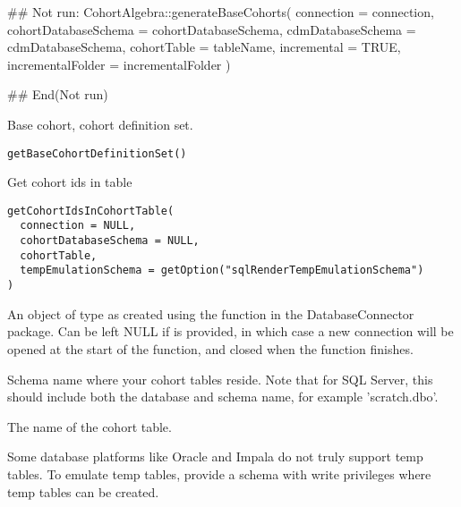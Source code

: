 \documentclass[a4paper]{book}
\begin{document}
%
\begin{Examples}
\begin{ExampleCode}
## Not run: 
CohortAlgebra::generateBaseCohorts(
  connection = connection,
  cohortDatabaseSchema = cohortDatabaseSchema,
  cdmDatabaseSchema = cdmDatabaseSchema,
  cohortTable = tableName,
  incremental = TRUE,
  incrementalFolder = incrementalFolder
)

## End(Not run)

\end{ExampleCode}
\end{Examples}
%
\begin{Description}\relax
Base cohort, cohort definition set.
\end{Description}
%
\begin{Usage}
\begin{verbatim}
getBaseCohortDefinitionSet()
\end{verbatim}
\end{Usage}
%
\begin{Description}\relax
Get cohort ids in table

\strong{[Stable]}
\end{Description}
%
\begin{Usage}
\begin{verbatim}
getCohortIdsInCohortTable(
  connection = NULL,
  cohortDatabaseSchema = NULL,
  cohortTable,
  tempEmulationSchema = getOption("sqlRenderTempEmulationSchema")
)
\end{verbatim}
\end{Usage}
%
\begin{Arguments}
\begin{ldescription}
\item[\code{connection}] An object of type  as created using the
 function in the
DatabaseConnector package. Can be left NULL if 
is provided, in which case a new connection will be opened at the start
of the function, and closed when the function finishes.

\item[\code{cohortDatabaseSchema}] Schema name where your cohort tables reside. Note that for SQL Server,
this should include both the database and schema name, for example
'scratch.dbo'.

\item[\code{cohortTable}] The name of the cohort table.

\item[\code{tempEmulationSchema}] Some database platforms like Oracle and Impala do not truly support
temp tables. To emulate temp tables, provide a schema with write
privileges where temp tables can be created.
\end{ldescription}
\end{Arguments}
\end{document}
